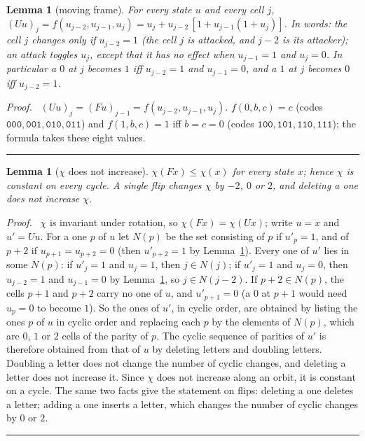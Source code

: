 \documentclass[10pt,a4paper]{article}
\newtheorem{lemma}[theorem]{Lemma}
\newcommand{\qedmark}{\rule{1.1ex}{1.1ex}}
\newenvironment{proof}[1][Proof]{\par\smallskip\noindent\textit{#1.}\ }{\hfill\qedmark\par\smallskip}
\newcommand{\code}[1]{\mathtt{#1}}            %
\begin{document}
\begin{lemma}[moving frame]\label{26:lem:frame}
For every state $u$ and every cell $j$,
$(Uu)_j=f(u_{j-2},u_{j-1},u_j)=u_j+u_{j-2}\,[1+u_{j-1}(1+u_j)]$.
In words: the cell $j$ changes only if $u_{j-2}=1$ (the cell $j$ is \emph{attacked}, and $j-2$ is its
\emph{attacker}); an attack toggles $u_j$, except that it has no effect when $u_{j-1}=1$ and $u_j=0$. In particular a
$0$ at $j$ becomes $1$ iff $u_{j-2}=1$ and $u_{j-1}=0$, and a $1$ at $j$ becomes $0$ iff $u_{j-2}=1$.
\end{lemma}
\begin{proof}
$(Uu)_j=(Fu)_{j-1}=f(u_{j-2},u_{j-1},u_j)$. $f(0,b,c)=c$ (codes $\code{000},\code{001},\code{010},\code{011}$) and
$f(1,b,c)=1$ iff $b=c=0$ (codes $\code{100},\code{101},\code{110},\code{111}$); the formula takes these eight values.
\end{proof}

\begin{lemma}[$\chi$ does not increase]\label{26:lem:chi}
$\chi(Fx)\le\chi(x)$ for every state $x$; hence $\chi$ is constant on every cycle. A single flip changes $\chi$ by
$-2$, $0$ or $2$, and deleting a one does not increase $\chi$.
\end{lemma}
\begin{proof}
$\chi$ is invariant under rotation, so $\chi(Fx)=\chi(Ux)$; write $u=x$ and $u'=Uu$. For a one $p$ of $u$ let $N(p)$
be the set consisting of $p$ if $u'_p=1$, and of $p+2$ if $u_{p+1}=u_{p+2}=0$ (then $u'_{p+2}=1$ by
Lemma~\ref{26:lem:frame}). Every one of $u'$ lies in some $N(p)$: if $u'_j=1$ and $u_j=1$, then $j\in N(j)$; if
$u'_j=1$ and $u_j=0$, then $u_{j-2}=1$ and $u_{j-1}=0$ by Lemma~\ref{26:lem:frame}, so $j\in N(j-2)$. If
$p+2\in N(p)$, the cells $p+1$ and $p+2$ carry no one of $u$, and $u'_{p+1}=0$ (a $0$ at $p+1$ would need $u_p=0$ to
become $1$). So the ones of $u'$, in cyclic order, are obtained by listing the ones $p$ of $u$ in cyclic order and
replacing each $p$ by the elements of $N(p)$, which are $0$, $1$ or $2$ cells of the parity of $p$. The cyclic
sequence of parities of $u'$ is therefore obtained from that of $u$ by deleting letters and doubling letters. Doubling
a letter does not change the number of cyclic changes, and deleting a letter does not increase it. Since $\chi$ does
not increase along an orbit, it is constant on a cycle. The same two facts give the statement on flips: deleting a one
deletes a letter; adding a one inserts a letter, which changes the number of cyclic changes by $0$ or $2$.
\end{proof}
\end{document}
